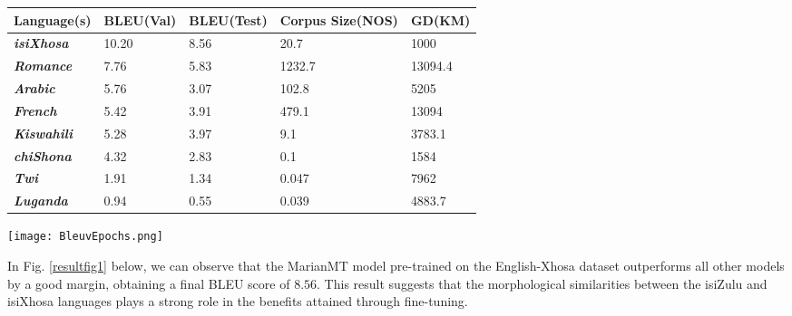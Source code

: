 \documentclass[11pt]{article}
\begin{document}
    
\begin{table*}
\centering

\begin{tabular}{|l|l|l|l|l|}
\hline
\textbf{Language(s)}        & \textbf{BLEU(Val)} & \textbf{BLEU(Test)} & \textbf{Corpus Size(NOS)} & \textbf{GD(KM)} \\ \hline
\textit{\textbf{isiXhosa}}  & 10.20                & 8.56                & 20.7                    & 1000              \\ \hline
\textit{\textbf{Romance}}   & 7.76                 & 5.83                & 1232.7                  & 13094.4           \\ \hline
\textit{\textbf{Arabic}}    & 5.76                 & 3.07                & 102.8                   & 5205              \\ \hline
\textit{\textbf{French}}    & 5.42                 & 3.91                & 479.1                   & 13094             \\ \hline
\textit{\textbf{Kiswahili}} & 5.28                 & 3.97                & 9.1                     & 3783.1            \\ \hline
\textit{\textbf{chiShona}}  & 4.32                 & 2.83                & 0.1                     & 1584              \\ \hline
\textit{\textbf{Twi}}       & 1.91                 & 1.34                & 0.047                   & 7962            \\ \hline
\textit{\textbf{Luganda}}   & 0.94                 & 0.55                & 0.039                   & 4883.7            \\ \hline
\end{tabular}
\caption{BLEU scores, GD and corpora size}
\label{table1}
\end{table*}



\begin{figure*}[h!]
\centering
\texttt{[image: BleuvEpochs.png]}
\caption{BLEU scores per epoch according to different pre-training languages, indicates high performance of morphologically similar isiXhosa, which outperforms a model trained on a very large corpora and rest of corpora.}
\label{resultfig1}
\end{figure*}

In Fig. \ref{resultfig1} below, we can observe that the MarianMT model pre-trained on the English-Xhosa dataset outperforms all other models by a good margin, obtaining a final BLEU score of $8.56$. This result suggests that the morphological similarities between the isiZulu and isiXhosa languages plays a strong role in the benefits attained through fine-tuning.
\end{document}
